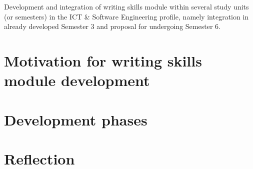 Development and integration of writing skills module within several study units (or semesters) in the ICT \& Software Engineering profile, namely integration in already developed Semester 3 and proposal for undergoing Semester 6.

\section{Motivation for writing skills module development}\label{chapter:didactics_motivation}


\section{Development phases}\label{chapter:didactics_motivation}


\section{Reflection}\label{chapter:didactics_motivation}
